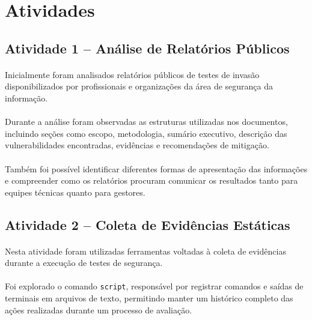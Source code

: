 \section{Atividades}

\subsection{Atividade 1 -- Análise de Relatórios Públicos}

\paragraph{}
Inicialmente foram analisados relatórios públicos de testes de invasão
disponibilizados por profissionais e organizações da área de segurança da
informação.

\paragraph{}
Durante a análise foram observadas as estruturas utilizadas nos documentos,
incluindo seções como escopo, metodologia, sumário executivo, descrição das
vulnerabilidades encontradas, evidências e recomendações de mitigação.

\paragraph{}
Também foi possível identificar diferentes formas de apresentação das
informações e compreender como os relatórios procuram comunicar os resultados
tanto para equipes técnicas quanto para gestores.

\subsection{Atividade 2 -- Coleta de Evidências Estáticas}

\paragraph{}
Nesta atividade foram utilizadas ferramentas voltadas à coleta de evidências
durante a execução de testes de segurança.

\paragraph{}
Foi explorado o comando \texttt{script}, responsável por registrar comandos e
saídas de terminais em arquivos de texto, permitindo manter um histórico
completo das ações realizadas durante um processo de avaliação.

